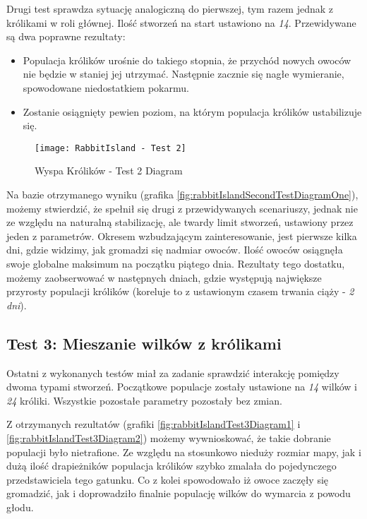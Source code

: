 \par Drugi test sprawdza sytuację analogiczną do pierwszej, tym razem jednak z królikami w roli głównej. Ilość stworzeń na start ustawiono na \emph{14}. Przewidywane są dwa poprawne rezultaty:
\begin{itemize}
	\item Populacja królików urośnie do takiego stopnia, że przychód nowych owoców nie będzie w staniej jej utrzymać. Następnie zacznie się nagłe wymieranie, spowodowane niedostatkiem pokarmu.
	\item Zostanie osiągnięty pewien poziom, na którym populacja królików ustabilizuje się.
\end{itemize}

\begin{figure}
	\texttt{[image: RabbitIsland - Test 2]}
	\caption{Wyspa Królików - Test 2 Diagram}
	\label{fig:rabbitIslandTest2Diagram1}
\end{figure}

\par Na bazie otrzymanego wyniku (grafika \ref{fig:rabbitIslandSecondTestDiagramOne}), możemy stwierdzić, że spełnił się drugi z przewidywanych scenariuszy, jednak nie ze względu na naturalną stabilizację, ale twardy limit stworzeń, ustawiony przez jeden z parametrów. Okresem wzbudzającym zainteresowanie, jest pierwsze kilka dni, gdzie widzimy, jak gromadzi się nadmiar owoców. Ilość owoców osiągnęła swoje globalne maksimum na początku piątego dnia. Rezultaty tego dostatku, możemy zaobserwować w następnych dniach, gdzie występują największe przyrosty populacji królików (koreluje to z ustawionym czasem trwania ciąży - \emph{2 dni}).

\subsection{Test 3: Mieszanie wilków z królikami}

\par Ostatni z wykonanych testów miał za zadanie sprawdzić interakcję pomiędzy dwoma typami stworzeń. Początkowe populacje zostały ustawione na \emph{14} wilków i \emph{24} króliki. Wszystkie pozostałe parametry pozostały bez zmian.

\par Z otrzymanych rezultatów (grafiki \ref{fig:rabbitIslandTest3Diagram1} i \ref{fig:rabbitIslandTest3Diagram2}) możemy wywnioskować, że takie dobranie populacji było nietrafione. Ze względu na stosunkowo nieduży rozmiar mapy, jak i dużą ilość drapieżników populacja królików szybko zmalała do pojedynczego przedstawiciela tego gatunku. Co z kolei spowodowało iż owoce zaczęły się gromadzić, jak i doprowadziło finalnie populację wilków do wymarcia z powodu głodu.


